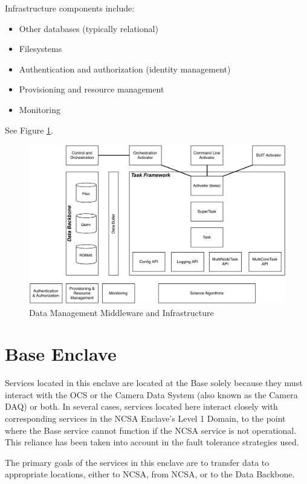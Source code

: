 \documentclass[DM,lsstdraft,toc]{lsstdoc}
\begin{document}
Infrastructure components include:
\begin{itemize}
\item
  Other databases (typically relational)
\item
  Filesystems
\item
  Authentication and authorization (identity management)
\item
  Provisioning and resource management
\item
  Monitoring
\end{itemize}

See Figure \ref{fig:mwandinfra}.

\begin{figure}
\centering
\includegraphics[width=\textwidth]{DM_Middleware_and_Infrastructure.png}
\caption{Data Management Middleware and Infrastructure}
\label{fig:mwandinfra}
\end{figure}

\section{Base Enclave}\label{base-enclave}

Services located in this enclave are located at the Base solely because
they must interact with the OCS or the Camera Data System (also known as
the Camera DAQ) or both. In several cases, services located here
interact closely with corresponding services in the NCSA Enclave's Level
1 Domain, to the point where the Base service cannot function if the
NCSA service is not operational. This reliance has been taken into
account in the fault tolerance strategies used.

The primary goals of the services in this enclave are to transfer data
to appropriate locations, either to NCSA, from NCSA, or to the Data
Backbone.
\end{document}
